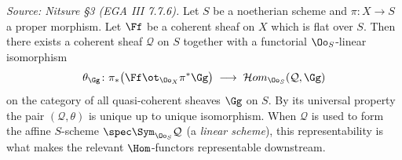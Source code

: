 \begin{theorem}
  \label{thm:cokernel-of-dual}
  \textit{Source: Nitsure §3 (EGA III 7.7.6).}
  Let $S$ be a noetherian scheme and $\pi\colon X\to S$ a proper morphism. Let
  $\Ff$ be a coherent sheaf on $X$ which is flat over $S$. Then there exists a
  coherent sheaf $\mathcal{Q}$ on $S$ together with a functorial
  $\Oo_S$-linear isomorphism
  \[
    \theta_{\Gg}\colon \pi_*\bigl(\Ff\ot_{\Oo_X}\pi^*\Gg\bigr)
      \;\longrightarrow\;\mathcal{H}om_{\Oo_S}(\mathcal{Q},\Gg)
  \]
  on the category of all quasi-coherent sheaves $\Gg$ on $S$. By its universal
  property the pair $(\mathcal{Q},\theta)$ is unique up to unique isomorphism.
  When $\mathcal{Q}$ is used to form the affine $S$-scheme
  $\spec\Sym_{\Oo_S}\mathcal{Q}$ (a \emph{linear scheme}), this representability
  is what makes the relevant $\Hom$-functors representable downstream.
\end{theorem}

